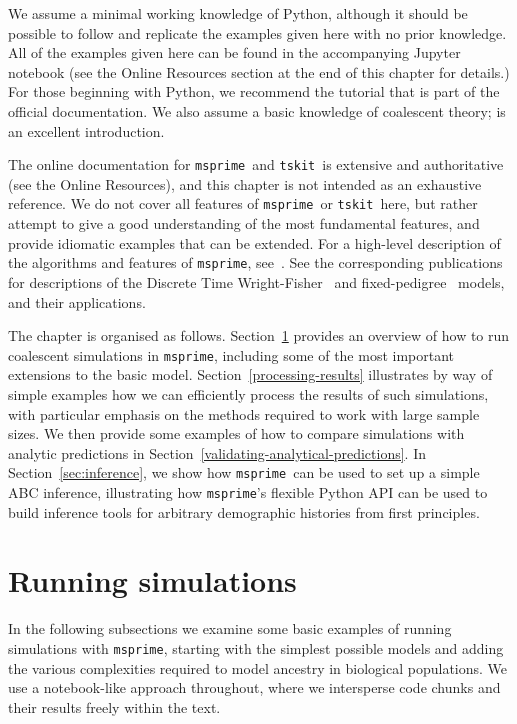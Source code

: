 \documentclass[graybox]{svmult}
\newcommand{\msprime}[0]{\texttt{msprime}}
\newcommand{\tskit}[0]{\texttt{tskit}}
\begin{document}
We assume a minimal working knowledge of Python, although it should be
possible to follow and replicate the examples given here with no prior
knowledge. All of the examples
given here can be found in the accompanying Jupyter notebook (see
the Online Resources section at the end of this chapter for details.)
For those beginning with Python, we recommend the
tutorial that is part of the official documentation.
We also assume a basic knowledge of coalescent theory;
\cite{wakely2008coalescent} is an excellent introduction.

The online documentation for \msprime\ and \tskit\ is extensive and
authoritative (see the Online Resources), and this chapter is not intended as an exhaustive reference.
We do not cover all features of \msprime\ or \tskit\ here, but rather
attempt to give a good understanding of the most fundamental features,
and provide idiomatic examples that can be extended. For a high-level
description of the algorithms and features of \msprime,
see~\cite{kelleher2016efficient,baumdicker2022efficient}.
See the corresponding publications for descriptions of
the Discrete Time Wright-Fisher~\cite{nelson2020accounting}
and fixed-pedigree~\cite{andersontrocme2023genes} models,
and their applications.

The chapter is organised as follows.
Section~\ref{running-simulations} provides an overview of how to run coalescent simulations in \msprime, including some of the most important extensions to the basic model.
Section~\ref{processing-results} illustrates by way of simple examples how we can efficiently process the results
of such simulations, with particular emphasis on the methods
required to work with large sample sizes. We then provide
some examples of how to compare simulations with analytic
predictions in Section~\ref{validating-analytical-predictions}.
In Section~\ref{sec:inference}, we show
how \msprime\ can be used to set up a simple ABC inference,
illustrating how
\msprime's flexible Python API can be used to build inference tools for
arbitrary demographic histories from first principles.

\section{Running simulations}
\label{running-simulations}
In the following subsections we examine some basic examples of running
simulations with \msprime, starting with the simplest possible models
and adding the various complexities required to model ancestry in biological populations.
We use a notebook-like approach throughout, where we
intersperse code chunks and their results freely within the text.
\end{document}
